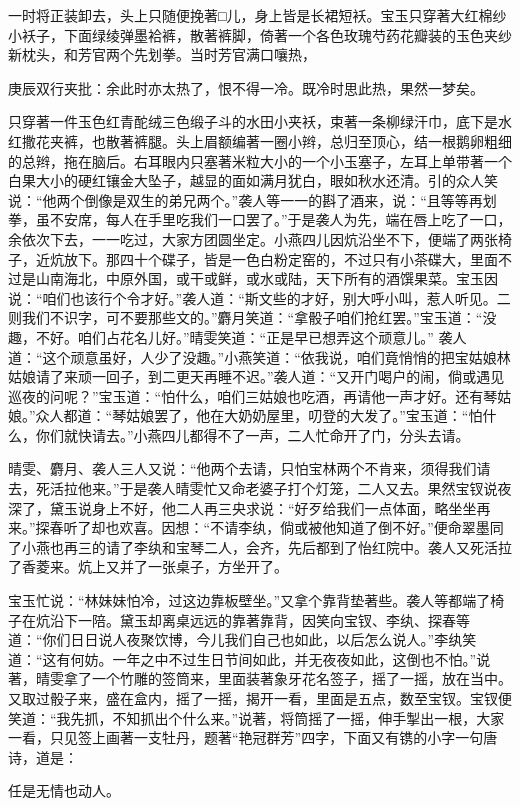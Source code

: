 \begin{parag}
    一时将正装卸去，头上只随便挽著□儿，身上皆是长裙短袄。宝玉只穿著大红棉纱小袄子，下面绿绫弹墨袷裤，散著裤脚，倚著一个各色玫瑰芍药花瓣装的玉色夹纱新枕头，和芳官两个先划拳。当时芳官满口嚷热，\begin{note}庚辰双行夹批：余此时亦太热了，恨不得一冷。既冷时思此热，果然一梦矣。\end{note}只穿著一件玉色红青酡绒三色缎子斗的水田小夹袄，束著一条柳绿汗巾，底下是水红撒花夹裤，也散著裤腿。头上眉额编著一圈小辫，总归至顶心，结一根鹅卵粗细的总辫，拖在脑后。右耳眼内只塞著米粒大小的一个小玉塞子，左耳上单带著一个白果大小的硬红镶金大坠子，越显的面如满月犹白，眼如秋水还清。引的众人笑说：“他两个倒像是双生的弟兄两个。”袭人等一一的斟了酒来，说：“且等等再划拳，虽不安席，每人在手里吃我们一口罢了。”于是袭人为先，端在唇上吃了一口，余依次下去，一一吃过，大家方团圆坐定。小燕四儿因炕沿坐不下，便端了两张椅子，近炕放下。那四十个碟子，皆是一色白粉定窑的，不过只有小茶碟大，里面不过是山南海北，中原外国，或干或鲜，或水或陆，天下所有的酒馔果菜。宝玉因说：“咱们也该行个令才好。”袭人道：“斯文些的才好，别大呼小叫，惹人听见。二则我们不识字，可不要那些文的。”麝月笑道：“拿骰子咱们抢红罢。”宝玉道：“没趣，不好。咱们占花名儿好。”晴雯笑道：“正是早已想弄这个顽意儿。” 袭人道：“这个顽意虽好，人少了没趣。”小燕笑道：“依我说，咱们竟悄悄的把宝姑娘林姑娘请了来顽一回子，到二更天再睡不迟。”袭人道：“又开门喝户的闹，倘或遇见巡夜的问呢？”宝玉道：“怕什么，咱们三姑娘也吃酒，再请他一声才好。还有琴姑娘。”众人都道：“琴姑娘罢了，他在大奶奶屋里，叨登的大发了。”宝玉道：“怕什么，你们就快请去。”小燕四儿都得不了一声，二人忙命开了门，分头去请。
\end{parag}


\begin{parag}
    晴雯、麝月、袭人三人又说：“他两个去请，只怕宝林两个不肯来，须得我们请去，死活拉他来。”于是袭人晴雯忙又命老婆子打个灯笼，二人又去。果然宝钗说夜深了，黛玉说身上不好，他二人再三央求说：“好歹给我们一点体面，略坐坐再来。”探春听了却也欢喜。因想：“不请李纨，倘或被他知道了倒不好。”便命翠墨同了小燕也再三的请了李纨和宝琴二人，会齐，先后都到了怡红院中。袭人又死活拉了香菱来。炕上又并了一张桌子，方坐开了。
\end{parag}


\begin{parag}
    宝玉忙说：“林妹妹怕冷，过这边靠板壁坐。”又拿个靠背垫著些。袭人等都端了椅子在炕沿下一陪。黛玉却离桌远远的靠著靠背，因笑向宝钗、李纨、探春等道：“你们日日说人夜聚饮博，今儿我们自己也如此，以后怎么说人。”李纨笑道：“这有何妨。一年之中不过生日节间如此，并无夜夜如此，这倒也不怕。”说著，晴雯拿了一个竹雕的签筒来，里面装著象牙花名签子，摇了一摇，放在当中。又取过骰子来，盛在盒内，摇了一摇，揭开一看，里面是五点，数至宝钗。宝钗便笑道：“我先抓，不知抓出个什么来。”说著，将筒摇了一摇，伸手掣出一根，大家一看，只见签上画著一支牡丹，题著“艳冠群芳”四字，下面又有镌的小字一句唐诗，道是：
\end{parag}
\begin{poem}
    \begin{pl}
        任是无情也动人。
    \end{pl}
\end{poem}

